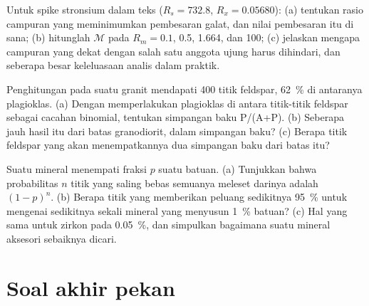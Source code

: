 \begin{exercise}[$\star\star\star$]\label{exo:b2:field-lab-methods-2:10}
Untuk spike stronsium dalam teks ($R_s = 732.8$, $R_x = 0.05680$): (a) tentukan rasio campuran
yang meminimumkan pembesaran galat, dan nilai pembesaran itu di sana; (b) hitunglah $\mathcal M$ pada
$R_m = 0.1$, 0.5, 1.664, dan 100; (c) jelaskan mengapa campuran yang dekat dengan salah satu anggota ujung harus
dihindari, dan seberapa besar keleluasaan analis dalam praktik.
\end{exercise}

\begin{exercise}[$\star\star\star$]\label{exo:b2:field-lab-methods-2:11}
Penghitungan pada suatu granit mendapati 400 titik feldspar, \qty{62}{\percent} di antaranya plagioklas. (a) Dengan memperlakukan
plagioklas di antara titik-titik feldspar sebagai cacahan binomial, tentukan simpangan baku
P/(A+P). (b) Seberapa jauh hasil itu dari batas granodiorit, dalam simpangan baku? (c) Berapa
titik feldspar yang akan menempatkannya dua simpangan baku dari batas itu?
\end{exercise}

\begin{exercise}[$\star\star\star$]\label{exo:b2:field-lab-methods-2:12}
Suatu mineral menempati fraksi $p$ suatu batuan. (a) Tunjukkan bahwa probabilitas $n$ titik yang saling bebas
semuanya meleset darinya adalah $(1-p)^n$. (b) Berapa titik yang memberikan peluang sedikitnya \qty{95}{\percent} untuk
mengenai sedikitnya sekali mineral yang menyusun \qty{1}{\percent} batuan? (c) Hal yang sama untuk zirkon pada
\qty{0.05}{\percent}, dan simpulkan bagaimana suatu mineral aksesori sebaiknya dicari.
\end{exercise}

\section*{Soal akhir pekan}

